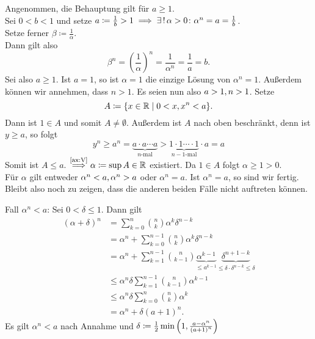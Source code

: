 \documentclass[../ana1.tex]{subfiles}
\begin{document}
\begin{bew}
	Angenommen, die Behauptung gilt für \(a \geq 1 \). \\
	Sei \(0 < b < 1\) und setze \(a \coloneqq \frac{1}{b} > 1 \implies \existse \, \alpha > 0 \colon \alpha^n = a = \frac{1}{b} \). \\
	Setze ferner \(\beta \coloneqq \frac{1}{\alpha}\). \\
	Dann gilt also
	\[ \beta^n = {\left(\frac{1}{\alpha}\right)}^n = \frac{1}{\alpha^n} = \frac{1}{a} = b.\]
	Sei also \(a \geq 1 \). Ist \(a = 1 \), so ist \(\alpha = 1 \) die einzige Lösung von \(\alpha^n = 1 \). Außerdem können wir annehmen, dass \(n > 1 \).
	Es seien nun also \(a > 1 , n > 1 \). Setze
	\[ A \coloneqq \{ x \in \mathbb{R} \; \vert \; 0 < x , x^n< a \}. \]
	Dann ist \(1 \in A \) und somit \(A \neq \emptyset \). Außerdem ist \(A \) nach oben beschränkt, denn ist \(y \geq a\), so folgt
	\[ y^n \geq a^n = \underbrace{a \cdot a \cdots a}_{n\text{-mal}} > \underbrace{1 \cdot 1 \cdots \cdot 1}_{n-1\text{-mal}} \cdot a = a \]
	Somit ist \(A \leq a \). \(\overset{\text{\autoref{ax:V}}}{\implies} \alpha \coloneqq \sup A \in \R \) existiert. Da \(1 \in A \) folgt \(\alpha \geq 1 > 0 \). \\
	Für \(\alpha \) gilt entweder \(\alpha^n <a , \alpha^n > a \) oder \(\alpha^n = a \). Ist \(\alpha^n = a \), so sind wir fertig. Bleibt also noch zu zeigen,
	dass die anderen beiden Fälle nicht auftreten können.
	\begin{faelle}
		\item[Fall \(\alpha^n < a\):] Sei \(0 < \delta \leq 1 \). Dann gilt
			\!\begin{align*}
				{(\alpha + \delta)}^n & = \sum_{k=0}^{n} \binom{n}{k} \alpha^k\delta^{n-k} \\
								  	  & = \alpha^n + \sum_{k=0}^{n-1} \binom{n}{k} \alpha^k\delta^{n-k} \\
									  & = \alpha^n + \sum_{k=1}^{n-1} \binom{n}{k-1} \underbrace{\alpha^{k-1}}_{\leq a^{k-1}}\underbrace{\delta^{n+1-k}}_{\leq \delta \cdot \delta^{n-k} \leq \delta} \\
									  & \leq \alpha^n \delta \sum_{k=1}^{n-1} \binom{n}{k-1} \alpha^{k-1} \\
									  & \leq \alpha^n \delta \sum_{k=0}^{n} \binom{n}{k} \alpha^{k} \\
									  & = \alpha^n + \delta {(a+1)}^n. \tag{\(*\)}
			\end{align*}
			Es gilt \(\alpha^n < a\) nach Annahme 
			und \(\delta \coloneqq \frac{1}{2} 
			\min{\left( 1 ,\frac{a-\alpha^n}{{(a+1)}^n} \right)} \) \\

\end{faelle}
\end{bew}
\end{document}
